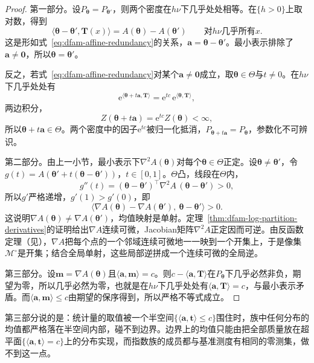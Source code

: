\begin{proof}
第一部分。设$P_{\bm{\theta}}=P_{\bm{\theta}'}$，则两个密度在$h\nu$下几乎处处相等。在$\{h>0\}$上取对数，得到
\[
  \langle\bm{\theta}-\bm{\theta}',\bm{T}(x)\rangle=A(\bm{\theta})-A(\bm{\theta}')\qquad\text{对}h\nu\text{几乎所有}x .
\]
这是形如式~\eqref{eq:dfam-affine-redundancy}的关系，$\bm{a}=\bm{\theta}-\bm{\theta}'$。最小表示排除了$\bm{a}\neq\bm{0}$，所以$\bm{\theta}=\bm{\theta}'$。

反之，若式~\eqref{eq:dfam-affine-redundancy}对某个$\bm{a}\neq\bm{0}$成立，取$\bm{\theta}\in\Theta$与$t\neq0$。在$h\nu$下几乎处处有
\[
  \mathrm{e}^{\langle\bm{\theta}+t\bm{a},\bm{T}\rangle}=\mathrm{e}^{tc}\,\mathrm{e}^{\langle\bm{\theta},\bm{T}\rangle},
\]
两边积分，
\[
  Z(\bm{\theta}+t\bm{a})=\mathrm{e}^{tc}Z(\bm{\theta})<\infty ,
\]
所以$\bm{\theta}+t\bm{a}\in\Theta$。两个密度中的因子$\mathrm{e}^{tc}$被归一化抵消，$P_{\bm{\theta}+t\bm{a}}=P_{\bm{\theta}}$，参数化不可辨识。

第二部分。由上一小节，最小表示下$\nabla^{2}A(\bm{\theta})$对每个$\bm{\theta}\in\Theta$正定。设$\bm{\theta}\neq\bm{\theta}'$，令$g(t)=A(\bm{\theta}'+t(\bm{\theta}-\bm{\theta}'))$，$t\in[0,1]$。$\Theta$凸，线段在$\Theta$内，
\[
  g''(t)=(\bm{\theta}-\bm{\theta}')^{\top}\nabla^{2}A\,(\bm{\theta}-\bm{\theta}')>0 ,
\]
所以$g'$严格递增，$g'(1)>g'(0)$，即
\[
  \bigl\langle\nabla A(\bm{\theta})-\nabla A(\bm{\theta}'),\ \bm{\theta}-\bm{\theta}'\bigr\rangle>0 .
\]
这说明$\nabla A(\bm{\theta})\neq\nabla A(\bm{\theta}')$，均值映射是单射。定理~\ref{thm:dfam-log-partition-derivatives}的证明给出$\nabla A$连续可微，Jacobian矩阵$\nabla^{2}A$正定因而可逆。由反函数定理（见），$\nabla A$把每个点的一个邻域连续可微地一一映到一个开集上，于是像集$\mathcal{M}^{\circ}$是开集；结合全局单射，这些局部逆拼成一个连续可微的全局逆。

第三部分。设$\bm{m}=\nabla A(\bm{\theta})$且$\langle\bm{a},\bm{m}\rangle=c$。则$c-\langle\bm{a},\bm{T}\rangle$在$P_{\bm{\theta}}$下几乎必然非负，期望为零，所以几乎必然为零，也就是在$h\nu$下几乎处处有$\langle\bm{a},\bm{T}\rangle=c$，与最小表示矛盾。而$\langle\bm{a},\bm{m}\rangle\leq c$由期望的保序得到，所以严格不等式成立。
\end{proof}

第三部分说的是：统计量的取值被一个半空间$\{\langle\bm{a},\bm{t}\rangle\leq c\}$围住时，族中任何分布的均值都严格落在半空间内部，碰不到边界。边界上的均值只能由把全部质量放在超平面$\{\langle\bm{a},\bm{t}\rangle=c\}$上的分布实现，而指数族的成员都与基准测度有相同的零测集，做不到这一点。

